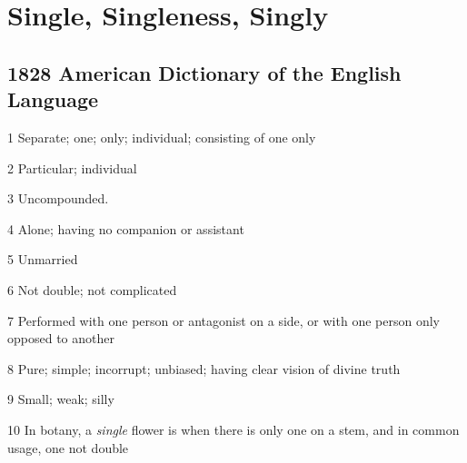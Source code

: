\section{Single, Singleness, Singly}
	\label{SINGLE}
	

\subsection{1828 American Dictionary of the English Language} %
	\label{SINGLE-1828}

	\begin{compactitem}
		\item[1] Separate; one; only; individual; consisting of one only
		\item[2] Particular; individual
		\item[3] Uncompounded.
		\item[4] Alone; having no companion or assistant
		\item[5] Unmarried
		\item[6] Not double; not complicated
		\item[7] Performed with one person or antagonist on a side, or with one person only opposed to another
		\item[8] Pure; simple; incorrupt; unbiased; having clear vision of divine truth
		\item[9] Small; weak; silly
		\item[10] In botany, a \textit{single} flower is when there is only one on a stem, and in common usage, one not double
	\end{compactitem}



